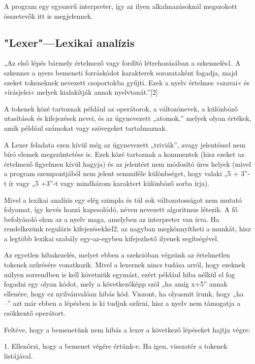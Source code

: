 A program egy egyszerű interpreter, így az ilyen alkalmazásoknál megszokott összetevők itt is megjelennek.

\subsection{"Lexer"—Lexikai analízis}

„Az első lépés bármely értelmező vagy fordító létrehozásában a szkennelés1. A szkenner a nyers bemeneti forráskódot karakterek sorozataként fogadja, majd ezeket tokeneknek nevezett csoportokba gyűjti. Ezek a nyelv értelmes »szavai« és »írásjelei« melyek kialakítják annak nyelvtanát.”[2]

A tokenek közé tartoznak például az operátorok, a változónevek, a különböző utasítások és kifejezések nevei, és az úgynevezett „atomok,” melyek olyan értékek, amik például számokat vagy szövegeket tartalmaznak.

A Lexer feladata ezen kívül még az úgynevezett „triviák”, avagy jelentéssel nem bíró elemek megszüntetése is. Ezek közé tartoznak a kommentek (hisz ezeket az értelmező figyelmen kívül hagyja) és az jelentést nem módosító üres helyek (mivel a program szempontjából nem jelent semmiféle különbséget, hogy valaki „5 + 3”-t ír vagy „5          +3”-t vagy mindhárom karaktert különböző sorba írja).

Mivel a lexikai analízis egy elég szimpla és túl sok változatosságot nem mutató folyamat, így kevés hozzá kapcsolódó, néven nevezett algoritmus létezik. A fő befolyásoló elem az a nyelv maga, amelyben az interpreter van írva. Ha rendelkezünk reguláris kifejezésekkel2, az nagyban megkönnyítheti a munkát, hisz a legtöbb lexikai szabály egy-az-egyben kifejezhető ilyenek segítségével.

Az egyetlen hibakezelés, melyet ebben a szekcióban végzünk az értelmetlen tokenek szűrésére vonatkozik. Mivel a lexernek nincs tudása arról, hogy ezeknek milyen sorrendben is kell követniük egymást, ezért például hiba nélkül el fog fogadni egy olyan kódot, mely a következőképp szól „ha amíg x+5” annak ellenére, hogy ez nyilvánvalóan hibás kód. Viszont, ha olyasmit írunk, hogy „ha --” azt már ebben a lépésben is ki tudjuk szűrni, hisz a nyelv nem támogatja a csökkentő operátort.

Feltéve, hogy a bemenetünk nem hibás a lexer a következő lépéseket hajtja végre:

    1. Ellenőrzi, hogy a bemenet végére értünk-e. Ha igen, visszatér a tokenek listájával.

